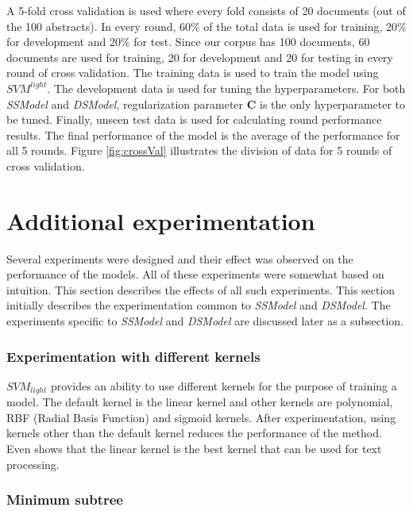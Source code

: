 A 5-fold cross validation is used where every fold consists of 20 documents (out of the 100 abstracts). In every round, 60\% of the total data is used for training, 20\% for development and 20\% for test. Since our corpus has 100 documents, 60 documents are used for training, 20 for development and 20 for testing in every round of cross validation. The training data is used to train the model using $SVM^{light}$. The development data is used for tuning the hyperparameters. For both \textit{SSModel} and \textit{DSModel}, regularization parameter $\mathbf{C}$ is the only hyperparameter to be tuned. Finally, unseen test data is used for calculating round performance results. The final performance of the model is the average of the performance for all 5 rounds. Figure \ref{fig:crossVal} illustrates the division of data for 5 rounds of cross validation.

\section{Additional experimentation}\label{sec:experiments}

Several experiments were designed and their effect was observed on the performance of the models. All of these experiments were somewhat based on intuition. This section describes the effects of all such experiments. This section initially describes the experimentation common to \textit{SSModel} and \textit{DSModel}. The experiments specific to \textit{SSModel} and \textit{DSModel} are discussed later as a subsection.

\subsubsection*{Experimentation with different kernels}

$SVM_{light}$ provides an ability to use different kernels for the purpose of training a model. The default kernel is the linear kernel and other kernels are polynomial, RBF (Radial Basis Function) and sigmoid kernels. After experimentation, using kernels other than the default kernel reduces the performance of the method. Even \cite{joachims1998text} shows that the linear kernel is the best kernel that can be used for text processing.

\subsubsection*{Minimum subtree}

